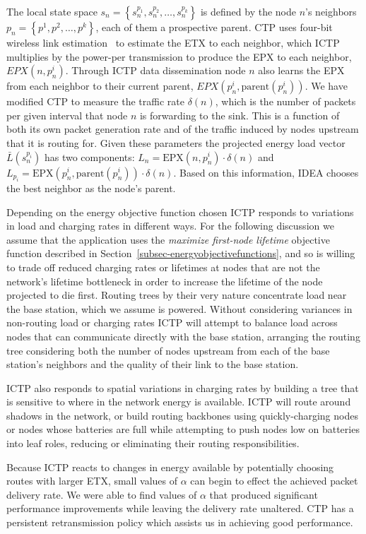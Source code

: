 \documentclass{sig-alternate}
\begin{document}
The local state space $s_n = \left\{s_n^{p_1}, s_n^{p_2}, \ldots, s_n^{p_k}
\right\}$ is defined by the node $n$'s neighbors $p_n = \left\{p^1, p^2,
\ldots, p^k \right\}$, each of them a prospective parent. CTP uses four-bit
wireless link estimation~\cite{Fonseca07} to estimate the ETX to each
neighbor, which ICTP multiplies by the power-per transmission to produce the
EPX to each neighbor, $EPX(n, p_n^i)$. Through ICTP data dissemination node
$n$ also learns the EPX from each neighbor to their current parent,
$EPX(p_n^i, \textrm{parent}(p_n^i))$. We have modified CTP to measure the
traffic rate $\delta(n)$, which is the number of packets per given interval
that node $n$ is forwarding to the sink. This is a function of both its own
packet generation rate and of the traffic induced by nodes upstream that it
is routing for. Given these parameters the projected energy load vector
$\bar{L}(s_n^{p_i})$ has two components: $L_n = \textrm{EPX}(n, p_n^i) \cdot
\delta(n)$ and $L_{p_i} = \textrm{EPX}(p_n^i, \textrm{parent}(p_n^i)) \cdot
\delta(n)$. Based on this information, IDEA chooses the best neighbor as the
node's parent.

Depending on the energy objective function chosen ICTP responds to variations
in load and charging rates in different ways. For the following discussion we
assume that the application uses the \textit{maximize first-node lifetime}
objective function described in
Section~\ref{subsec-energyobjectivefunctions}, and so is willing to trade off
reduced charging rates or lifetimes at nodes that are not the network's
lifetime bottleneck in order to increase the lifetime of the node projected
to die first. Routing trees by their very nature concentrate load near the
base station, which we assume is powered. Without considering variances in
non-routing load or charging rates ICTP will attempt to balance load across
nodes that can communicate directly with the base station, arranging the
routing tree considering both the number of nodes upstream from each of the
base station's neighbors and the quality of their link to the base station.

ICTP also responds to spatial variations in charging rates by building a tree
that is sensitive to where in the network energy is available. ICTP will
route around shadows in the network, or build routing backbones using
quickly-charging nodes or nodes whose batteries are full while attempting to
push nodes low on batteries into leaf roles, reducing or eliminating their
routing responsibilities.

Because ICTP reacts to changes in energy available by potentially choosing
routes with larger ETX, small values of $\alpha$ can begin to effect the
achieved packet delivery rate. We were able to find values of $\alpha$ that
produced significant performance improvements while leaving the delivery rate
unaltered. CTP has a persistent retransmission policy which assists us in
achieving good performance.
\end{document}
